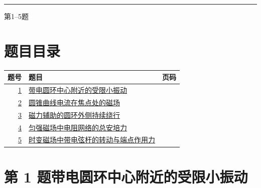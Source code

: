 \documentclass[UTF8,fontset=fandol,a4paper,11pt]{ctexart}
\begin{document}

\thispagestyle{empty}\vspace*{22mm}

\par\vspace{12mm}

\par\vspace{12mm}

\par\vspace{9mm}

\noindent\textcolor{accent}{\rule{\linewidth}{1pt}}\par\vspace{9mm}

\noindent 第1--5题\par\vfill\clearpage

\section*{题目目录}

\begin{longtable}{@{}r p{113mm} r@{}}\toprule 题号 & 题目 & 页码\\\midrule

\hyperref[q:1]{1} & \hyperref[q:1]{带电圆环中心附近的受限小振动} & \pageref{q:1} \\

\hyperref[q:2]{2} & \hyperref[q:2]{圆锥曲线电流在焦点处的磁场} & \pageref{q:2} \\

\hyperref[q:3]{3} & \hyperref[q:3]{磁力辅助的圆环外侧持续绕行} & \pageref{q:3} \\

\hyperref[q:4]{4} & \hyperref[q:4]{匀强磁场中电阻网络的总安培力} & \pageref{q:4} \\

\hyperref[q:5]{5} & \hyperref[q:5]{时变磁场中带电弦杆的转动与端点作用力} & \pageref{q:5} \\

\bottomrule\end{longtable}

\clearpage


\section*{第 1 题\quad 带电圆环中心附近的受限小振动}\label{q:1}
\end{document}
